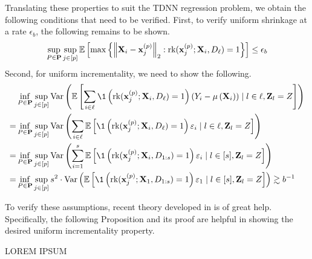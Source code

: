 Translating these properties to suit the TDNN regression problem, we obtain the following conditions that need to be verified.
First, to verify uniform shrinkage at a rate $\epsilon_b$, the following remains to be shown.
\begin{equation}
	\sup_{P \in \mathbf{P}} \sup_{j \in[p]}
	\mathbb{E}\left[\max \left\{\left\|\mathbf{X}_i-\mathbf{x}^{(p)}_{j}\right\|_{2}:
	\text{rk}(\mathbf{x}^{(p)}_{j}; \mathbf{X}_i, D_{\ell}) = 1\right\}\right]
	\leq \epsilon_b
\end{equation}
Second, for uniform incrementality, we need to show the following.
\begin{equation}
	\begin{aligned}
		  & \inf_{P \in \mathbf{P}} \sup_{j \in[p]}
		\Var\left(\E\left[
				\sum_{i \in \ell} \1\left(\rk(\mathbf{x}^{(p)}_{j}; \mathbf{X}_i, D_{\ell}) = 1\right) \left(Y_i - \mu\left(\mathbf{X}_i\right)\right) \mid l \in \ell, \mathbf{Z}_l = Z\right]
		\right)                                     \\
		= & \inf_{P \in \mathbf{P}} \sup_{j \in[p]}
		\Var\left(
		\sum_{i \in \ell}\E\left[\1\left(\rk(\mathbf{x}^{(p)}_{j}; \mathbf{X}_i, D_{\ell}) = 1\right) \varepsilon_i \mid l \in \ell, \mathbf{Z}_l = Z\right]
		\right)                                     \\
		= & \inf_{P \in \mathbf{P}} \sup_{j \in[p]}
		\Var\left(
		\sum_{i = 1}^{s}\E\left[\1\left(\rk(\mathbf{x}^{(p)}_{j}; \mathbf{X}_i, D_{1:s}) = 1\right) \varepsilon_i \mid l \in [s], \mathbf{Z}_l = Z\right]
		\right)                                     \\
		= & \inf_{P \in \mathbf{P}} \sup_{j \in[p]}
		s^2 \cdot \Var\left(
		\E\left[\1\left(\rk(\mathbf{x}^{(p)}_{j}; \mathbf{X}_1, D_{1:s}) = 1\right) \varepsilon_1 \mid l \in [s], \mathbf{Z}_l = Z\right]
		\right)
		\gtrsim b^{-1}
	\end{aligned}
\end{equation}

To verify these assumptions, recent theory developed in \citet{peng_rates_2022} is of great help.
Specifically, the following Proposition and its proof are helpful in showing the desired uniform incrementality property.

	{\color{red} LOREM IPSUM}

